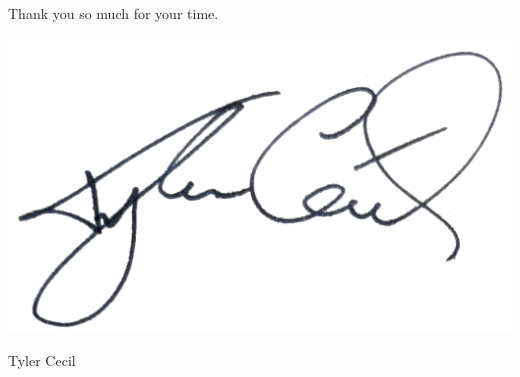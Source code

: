 \documentclass[sans, a4paper]{article}
\begin{document}
\begin{adjustwidth}{40pt}{40pt}
  Thank you so much for your time.

  \vspace{-0.75em}
  \includegraphics[height=5\baselineskip]{sig}
  \vspace{-0.75em}

  Tyler Cecil
\end{adjustwidth}
\end{document}
